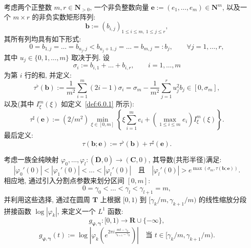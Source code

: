 \begin{theorem}\label{thm:6.0.2}
考虑两个正整数 $m, r \in \mathbf{N}_{>0}$, 一个非负整数向量 $\mathbf{e} := (e_1, \dots, e_m) \in \mathbf{N}^m$, 以及一个 $m \times r$ 的非负实数矩形阵列:
\[ \mathbf{b} := (b_{i,j})_{1 \le i \le m, \ 1 \le j \le r}, \]
其所有列均具有如下形式:
\begin{equation}\label{eq:6.0.3}
0 = b_{1,j} = \dots = b_{u_j,j} < b_{u_j+1,j} = \dots = b_{m,j} =: b_j, \qquad \forall j = 1, \dots, r,
\end{equation}
其中 $u_j \in \{0, 1, \dots, m\}$ 取决于列.
设
\[ \sigma_i := b_{i,1} + \dots + b_{i,r}, \qquad i = 1, \dots, m \]
为第 $i$ 行的和, 并定义:
\begin{equation}\label{eq:6.0.4}
\tau^{\flat}(\mathbf{b}) := \frac{1}{m^2} \sum_{i=1}^{m} (2i - 1)\sigma_i = \sigma_m - \frac{1}{m^2} \sum_{j=1}^{r} u_j^2 b_j \in [0, \sigma_m],
\end{equation}
以及(其中 $I_{\xi}^m(\xi)$ 如定义~\ref{def:6.0.1} 所示):
\begin{equation}\label{eq:6.0.5}
\tau^{\sharp}(\mathbf{e}) := (2/m^2) \min_{\xi \in [0,m]} \left\{ \xi \sum_{i=1}^m e_i + \left( \max_{1 \le i \le m} e_i \right) I_{\xi}^m(\xi) \right\}.
\end{equation}
最后定义:
\begin{equation}\label{eq:6.0.6}
\tau(\mathbf{b}; \mathbf{e}) := \tau^{\flat}(\mathbf{b}) + \tau^{\sharp}(\mathbf{e}).
\end{equation}

考虑一族全纯映射 $\varphi_0, \dots, \varphi_l : (\overline{\mathbf{D}}, 0) \to (\mathbf{C}, 0)$, 其导数(共形半径)满足:
\begin{equation}\label{eq:6.0.7}
|\varphi_0'(0)| < |\varphi_1'(0)| < \dots < |\varphi_l'(0)| \quad 且 \quad |\varphi_l'(0)| > e^{\max(\sigma_m, \tau(\mathbf{b}; \mathbf{e}))}.
\end{equation}
相应地, 通过引入分割点参数来划分区间 $[0,m]$:
\[ 0 = \gamma_0 < \dots < \gamma_l < \gamma_{l+1} = m, \]
并利用这些选择, 通过在圆周 $\mathbf{T}$ 上根据 $[0,1)$ 到 $[\gamma_k/m, \gamma_{k+1}/m)$ 的线性缩放分段拼接函数 $\log |\varphi_k|$, 来定义一个 $L^1$ 函数:
\[ g_{\boldsymbol{\varphi},\boldsymbol{\gamma}}:[0,1)\to\mathbf{R}\cup\{-\infty\}, \]
\begin{equation}\label{eq:6.0.8}
g_{\boldsymbol{\varphi},\boldsymbol{\gamma}}(t):=\log\left|\varphi_k\left(e^{2\pi i\frac{mt-\gamma_k}{\gamma_{k+1}-\gamma_k}}\right)\right| \quad \text{当 } t\in[\gamma_k/m,\gamma_{k+1}/m).
\end{equation}


\end{theorem}
